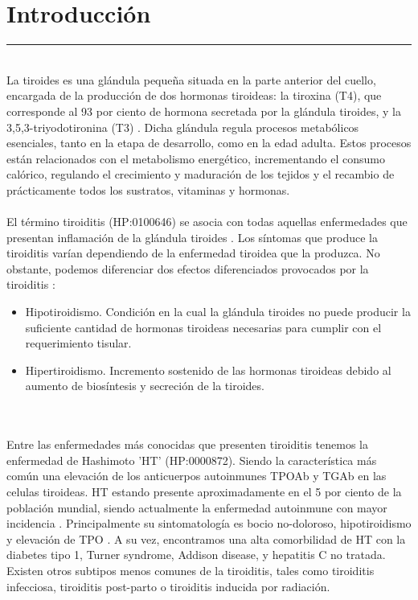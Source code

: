 \section{Introducción}

\hrule
\vspace{5mm}
\\
La tiroides es una glándula pequeña situada en la parte anterior del cuello, encargada de la producción de dos hormonas tiroideas: la tiroxina (T4), que 
corresponde al 93 por ciento de hormona secretada por la glándula tiroides, y la 3,5,3-triyodotironina (T3) \cite{Stegmann} . Dicha glándula regula procesos metabólicos esenciales, tanto en la etapa de desarrollo, como en la edad adulta. Estos procesos están relacionados con el metabolismo energético, incrementando el consumo calórico, regulando el crecimiento y maduración de los tejidos y el recambio de prácticamente todos los sustratos, vitaminas y hormonas.  \cite{Stegmann} 
\\ \\
El término tiroiditis (HP:0100646) se asocia con todas aquellas enfermedades que presentan inflamación de la glándula tiroides \cite{Sweeney2014}. Los síntomas que produce la tiroiditis varían dependiendo de la enfermedad tiroidea que la produzca. No obstante, podemos diferenciar dos efectos diferenciados provocados por la tiroiditis \cite{Pulgarin} : 
\begin{itemize}
    \item Hipotiroidismo. Condición en la cual la glándula tiroides no puede producir la suficiente cantidad de hormonas tiroideas necesarias para cumplir con el requerimiento tisular.
    \item Hipertiroidismo. Incremento sostenido de las hormonas tiroideas debido al aumento de biosíntesis y secreción de la tiroides.
\end{itemize} 
\\ \\
\vspace{5mm}
Entre las enfermedades más conocidas que presenten tiroiditis tenemos la enfermedad de Hashimoto 'HT' (HP:0000872). Siendo la característica más común una elevación de los anticuerpos autoinmunes TPOAb y TGAb en las celulas tiroideas. HT estando presente aproximadamente en el 5 por ciento de la población mundial, siendo actualmente la enfermedad autoinmune con mayor incidencia \cite{Zheng2020}. Principalmente su sintomatología es bocio no-doloroso, hipotiroidismo y elevación de TPO \cite{Sweeney2014}. A su vez, encontramos una alta comorbilidad de HT con la diabetes tipo 1, Turner syndrome, Addison disease, y hepatitis C no tratada.\cite{Sweeney2014} 
Existen otros subtipos menos comunes de la tiroiditis, tales como tiroiditis infecciosa, tiroiditis post-parto o tiroiditis inducida por radiación. \cite{Sweeney2014}  
\vspace{20mm}

